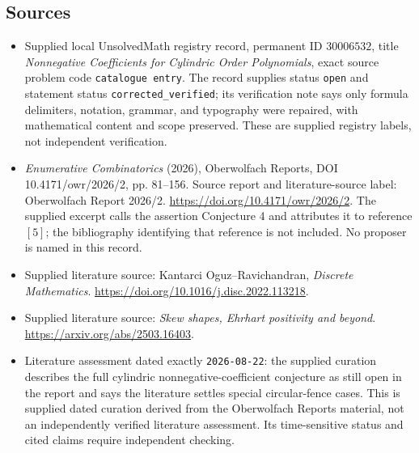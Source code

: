 \documentclass[11pt]{article}
\begin{document}
\subsection{Sources}
\begin{itemize}
\item Supplied local UnsolvedMath registry record, permanent ID \(30006532\), title \emph{Nonnegative Coefficients for Cylindric Order Polynomials}, exact source problem code \texttt{catalogue entry}. The record supplies status \texttt{open} and statement status \texttt{corrected\_verified}; its verification note says only formula delimiters, notation, grammar, and typography were repaired, with mathematical content and scope preserved. These are supplied registry labels, not independent verification.
\item \emph{Enumerative Combinatorics} (2026), Oberwolfach Reports, DOI 10.4171/owr/2026/2, pp. 81--156. Source report and literature-source label: Oberwolfach Report 2026/2. \url{https://doi.org/10.4171/owr/2026/2}. The supplied excerpt calls the assertion Conjecture 4 and attributes it to reference \([5]\); the bibliography identifying that reference is not included. No proposer is named in this record.
\item Supplied literature source: Kantarci Oguz--Ravichandran, \emph{Discrete Mathematics}. \url{https://doi.org/10.1016/j.disc.2022.113218}.
\item Supplied literature source: \emph{Skew shapes, Ehrhart positivity and beyond}. \url{https://arxiv.org/abs/2503.16403}.
\item Literature assessment dated exactly \texttt{2026-08-22}: the supplied curation describes the full cylindric nonnegative-coefficient conjecture as still open in the report and says the literature settles special circular-fence cases. This is supplied dated curation derived from the Oberwolfach Reports material, not an independently verified literature assessment. Its time-sensitive status and cited claims require independent checking.
\end{itemize}
\end{document}
